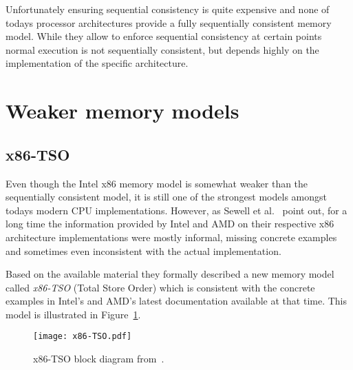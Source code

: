 \documentclass[a4paper,12pt,notitlepage,twoside,openright]{article}
\begin{document}
Unfortunately ensuring sequential consistency is quite expensive and
none of todays processor architectures provide a fully sequentially
consistent memory model. While they allow to enforce sequential
consistency at certain points normal execution is not sequentially
consistent, but depends highly on the implementation of the specific
architecture.

\section{Weaker memory models}

\subsection{x86-TSO}
Even though the Intel x86 memory model is somewhat weaker than the
sequentially consistent model, it is still one of the strongest models
amongst todays modern CPU implementations. However, as Sewell et
al.~\cite{Sewell:2010:XRU:1785414.1785443} point out, for a long time
the information provided by Intel and AMD on their respective x86
architecture implementations were mostly informal, missing
concrete examples and sometimes even inconsistent with the actual
implementation.

Based on the available material they formally described a new memory model
called \emph{x86-TSO} (Total Store Order) which is consistent with the
concrete examples in Intel's and AMD's latest documentation available
at that time. This model is illustrated in Figure~\ref{fig:x86-TSO}.

\begin{figure}[h]
	\centering
	\texttt{[image: x86-TSO.pdf]}
	\caption{x86-TSO block diagram from~\cite{Sewell:2010:XRU:1785414.1785443}.}
	\label{fig:x86-TSO}
\end{figure}
\end{document}
